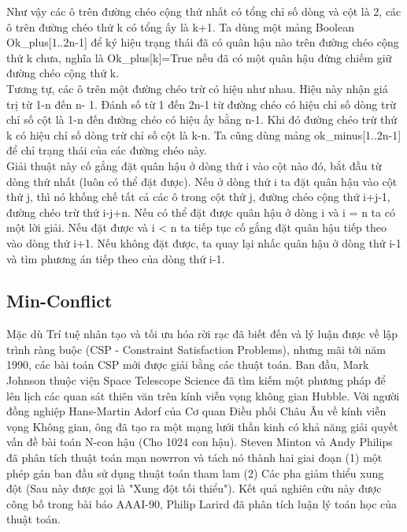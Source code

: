 \documentclass{hcmutarticle}
\begin{document}
Như vậy các ô trên đường chéo cộng thứ nhất có tổng chỉ số dòng và cột là 2, các ô trên đường chéo thứ k có tổng ấy là k+1. Ta dùng một mảng Boolean Ok\_plus[1..2n-1] để ký hiệu trạng thái đã có quân hậu nào trên đường chéo cộng thứ k chưa, nghĩa là Ok\_plus[k]=True nếu đã có một quân hậu đứng chiếm giữ đường chéo cộng thứ k.\\

Tương tự, các ô trên một đường chéo trừ có hiệu như nhau. Hiệu này nhận giá trị từ 1-n đến n- 1. Đánh số từ 1 đến 2n-1 từ đường chéo có hiệu chỉ số dòng trừ chỉ số cột là 1-n đến đường chéo có hiệu ấy bằng n-1. Khi đó đường chéo trừ thứ k có hiệu chỉ số dòng trừ chỉ số cột là k-n. Ta cũng dùng mảng ok\_minus[1..2n-1] để chỉ trạng thái của các đường chéo này.\\

Giải thuật này cố gắng đặt quân hậu ở dòng thứ i vào cột nào đó, bắt đầu từ dòng thứ nhất (luôn có thể đặt được). Nếu ở dòng thứ i ta đặt quân hậu vào cột thứ j, thì nó khống chế tất cả các ô trong cột thứ j, đường chéo cộng thứ i+j-1, đường chéo trừ thứ i-j+n. Nếu có thể đặt được quân hậu ở dòng i và i = n ta có một lời giải. Nếu đặt được và i < n ta tiếp tục cố gắng đặt quân hậu tiếp theo vào dòng thứ i+1. Nếu không đặt được, ta quay lại nhấc quân hậu ở dòng thứ i-1 và tìm phương án tiếp theo của dòng thứ i-1.



\subsection{Min-Conflict}

Mặc dù Trí tuệ nhân tạo và tối ưu hóa rời rạc đã biết đến và lý luận được về lập trình ràng buộc (CSP - Constraint Satisfaction Problems), nhưng mãi tới năm 1990, các bài toán CSP mới được giải bằng các thuật toán. Ban đầu, Mark Johnson thuộc viện Space Telescope Science đã tìm kiếm một phương pháp để lên lịch các quan sát thiên văn trên kính viễn vọng không gian Hubble. Với người đồng nghiệp Hans-Martin Adorf của Cơ quan Điều phối Châu Âu về kính viễn vọng Không gian, ông đã tạo ra một mạng lưới thần kinh có khả năng giải quyết vấn đề bài toán N-con hậu (Cho 1024 con hậu). Steven Minton và Andy Philips đã phân tích thuật toán mạn nowrron và tách nó thành hai giai đoạn (1) một phép gán ban đầu sử dụng thuật toán tham lam (2) Các pha giảm thiểu xung đột (Sau này được gọi là "Xung đột tối thiểu").  Kết quả nghiên cứu này được công bố trong bài báo AAAI-90, Philip Larird đã phân tích luận lý toán học của thuật toán.
\end{document}
